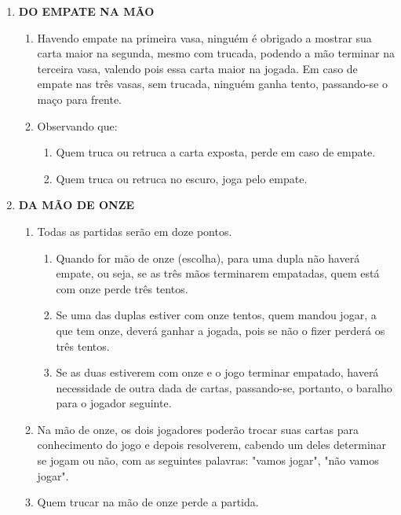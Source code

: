 \begin{article}
\begin{enumerate}[noitemsep]
		\item \textbf{DO EMPATE NA MÃO}
		\begin{enumerate}[noitemsep]
			\item Havendo empate na primeira vasa, ninguém é obrigado a mostrar sua carta maior na segunda, mesmo com trucada, podendo a mão terminar na terceira vasa, valendo pois essa carta maior na jogada. Em caso de empate nas três vasas, sem trucada, ninguém ganha tento, passando-se o maço para frente.
			\item Observando que:
			\begin{enumerate}[noitemsep]
				\item Quem truca ou retruca a carta exposta, perde em caso de empate.
				\item Quem truca ou retruca no escuro, joga pelo empate.
			\end{enumerate}
		\end{enumerate}

		\item \textbf{DA MÃO DE ONZE}
		\begin{enumerate}[noitemsep]
			\item Todas as partidas serão em doze pontos.
			\begin{enumerate}[noitemsep]
				\item Quando for mão de onze (escolha), para uma dupla não haverá empate, ou seja, se as três mãos terminarem empatadas, quem está com onze perde três tentos.
				\item Se uma das duplas estiver com onze tentos, quem mandou jogar, a que tem onze, deverá ganhar a jogada, pois se não o fizer perderá os três tentos.
				\item Se as duas estiverem com onze e o jogo terminar empatado, haverá necessidade de outra dada de cartas, passando-se, portanto, o baralho para o jogador seguinte.
			\end{enumerate}
			\item Na mão de onze, os dois jogadores poderão trocar suas cartas para conhecimento do jogo e depois resolverem, cabendo um deles determinar se jogam ou não, com as seguintes palavras: "vamos jogar", "não vamos jogar".
			\item Quem trucar na mão de onze perde a partida.
		\end{enumerate}
	\end{enumerate}
\end{article}

